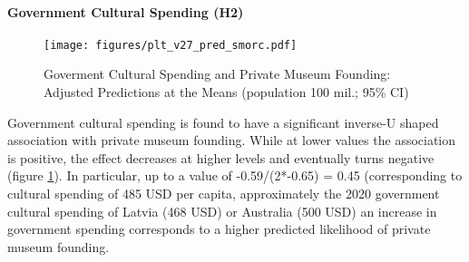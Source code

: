\documentclass[11pt]{article}
\begin{document}
\paragraph*{Government Cultural Spending (H2)}

\begin{figure}[htbp]
\centering
\texttt{[image: figures/plt\_v27\_pred\_smorc.pdf]}
\caption{\label{fig:pred_smorc}Goverment Cultural Spending and Private Museum Founding: Adjusted Predictions at the Means (population 100 mil.; 95\% CI)}
\end{figure}

Government cultural spending is found to have a significant inverse-U shaped association with private museum founding.
While at lower values the association is positive, the effect decreases at higher levels and eventually turns negative (figure \ref{fig:pred_smorc}).
In particular, up to a value of -0.59/(2*-0.65) = 0.45 (corresponding to cultural spending of 485 USD per capita, approximately the 2020 government cultural spending of Latvia (468 USD) or Australia (500 USD) an increase in government spending corresponds to a higher predicted likelihood of private museum founding.
\end{document}
